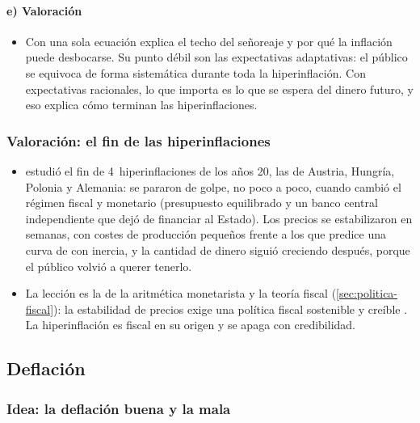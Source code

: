 \documentclass[11pt]{article}
\begin{document}
\paragraph{e) Valoración}

\begin{itemize}
\item Con una sola ecuación explica el techo del señoreaje y por qué la inflación puede desbocarse. Su punto débil son las expectativas adaptativas: el público se equivoca de forma sistemática durante toda la hiperinflación. Con expectativas racionales, lo que importa es lo que se espera del dinero futuro, y eso explica cómo terminan las hiperinflaciones.
\end{itemize}

\subsubsection{Valoración: el fin de las hiperinflaciones}\label{sec:fin-hiperinflaciones}

\begin{itemize}
\item \textcite{Sargent1982Ends} estudió el fin de 4~hiperinflaciones de los años 20, las de Austria, Hungría, Polonia y Alemania: se pararon de golpe, no poco a poco, cuando cambió el régimen fiscal y monetario (presupuesto equilibrado y un banco central independiente que dejó de financiar al Estado). Los precios se estabilizaron en semanas, con costes de producción pequeños frente a los que predice una curva de  con inercia, y la cantidad de dinero siguió creciendo después, porque el público volvió a querer tenerlo.
\item La lección es la de la aritmética monetarista y la teoría fiscal (\ref{sec:politica-fiscal}): la estabilidad de precios exige una política fiscal sostenible y creíble . La hiperinflación es fiscal en su origen y se apaga con credibilidad.
\end{itemize}

\subsection{Deflación}\label{sec:deflacion}

\subsubsection{Idea: la deflación buena y la mala}\label{sec:deflacion-idea}
\end{document}
